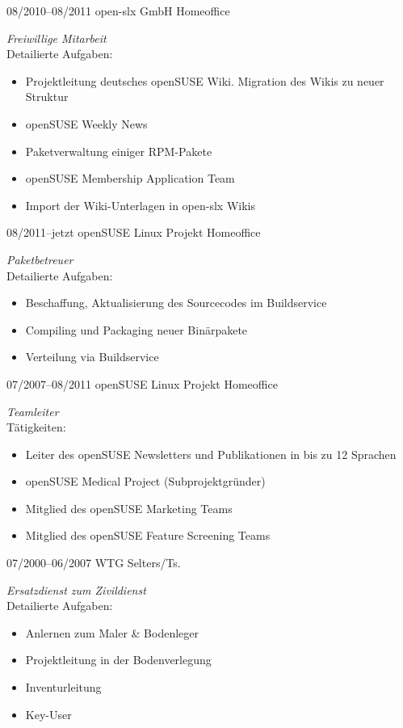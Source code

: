 \documentclass[a4paper,latin]{friggeri-cv} %
\begin{document}
\begin{entrylist}
\entry
{08/2010--08/2011}
{open-slx GmbH}
{Homeoffice}
{\emph{Freiwillige Mitarbeit}\\
Detailierte Aufgaben:
\begin{itemize}
\item Projektleitung deutsches openSUSE Wiki. Migration des Wikis zu neuer Struktur
\item openSUSE Weekly News
\item Paketverwaltung einiger RPM-Pakete
\item openSUSE Membership Application Team
\item Import der Wiki-Unterlagen in open-slx Wikis 
\end{itemize}
}
\entry
{08/2011--jetzt}
{openSUSE Linux Projekt}
{Homeoffice}
{\emph{Paketbetreuer}\\
Detailierte Aufgaben:
\begin{itemize}
\item Beschaffung, Aktualisierung des Sourcecodes im Buildservice
\item Compiling und Packaging neuer Binärpakete
\item Verteilung via Buildservice
\end{itemize}
}
\entry
{07/2007--08/2011}
{openSUSE Linux Projekt}
{Homeoffice}
{\emph{Teamleiter}\\
Tätigkeiten:
\begin{itemize}
\item Leiter des openSUSE Newsletters und Publikationen in bis zu 12 Sprachen
\item openSUSE Medical Project (Subprojektgründer)
\item Mitglied des openSUSE Marketing Teams
\item Mitglied des openSUSE Feature Screening Teams
\end{itemize}
}
\entry
{07/2000--06/2007}
{WTG}
{Selters/Ts.}
{\emph{Ersatzdienst zum Zivildienst}\\
Detailierte Aufgaben:
\begin{itemize}
\item Anlernen zum Maler \& Bodenleger
\item Projektleitung in der Bodenverlegung
\item Inventurleitung
\item Key-User
\end{itemize}
}
\end{entrylist}
\end{document}

